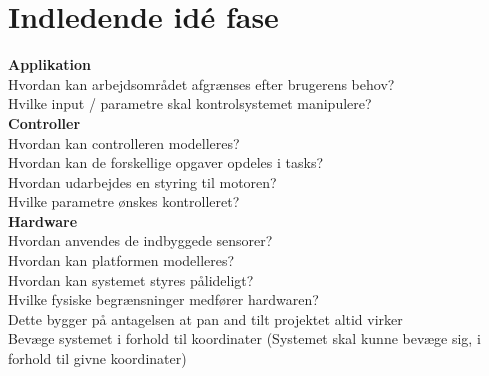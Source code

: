\section{Indledende idé fase}
\textbf{Applikation}\\
Hvordan kan arbejdsområdet afgrænses efter brugerens behov?\\
Hvilke input / parametre skal kontrolsystemet manipulere?\\

\textbf{Controller}\\
Hvordan kan controlleren modelleres?\\
Hvordan kan de forskellige opgaver opdeles i tasks?\\
Hvordan udarbejdes en styring til motoren?\\
Hvilke parametre ønskes kontrolleret?\\


\textbf{Hardware}\\
Hvordan anvendes de indbyggede sensorer?\\
Hvordan kan platformen modelleres?\\
Hvordan kan systemet styres pålideligt?\\
Hvilke fysiske begrænsninger medfører hardwaren?\\
Dette bygger på antagelsen at pan and tilt projektet altid virker\\
Bevæge systemet i forhold til koordinater (Systemet skal kunne bevæge sig, i forhold til givne koordinater)\\